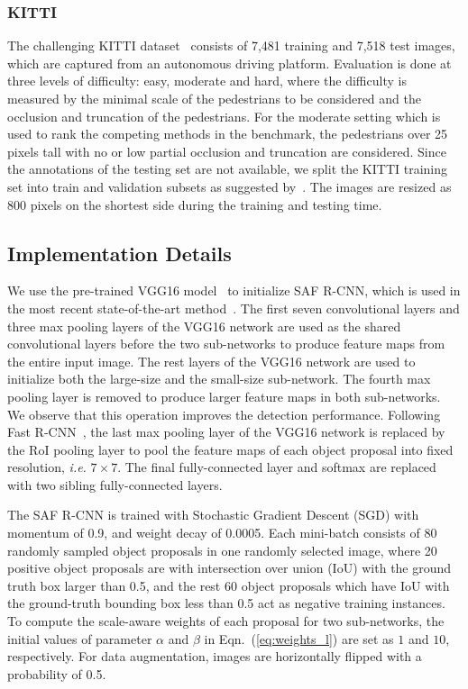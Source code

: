\documentclass[journal]{IEEEtran}
\begin{document}
\subsubsection{KITTI}
The challenging KITTI dataset~\cite{geiger2012we} consists of 7,481 training and 7,518 test images, which are captured from an autonomous driving platform. Evaluation is done at three levels of difficulty: easy, moderate and hard, where the difficulty is measured by the minimal scale of the pedestrians to be considered and the occlusion and truncation of the pedestrians. For the moderate setting which is used to rank the competing methods in the benchmark, the pedestrians over 25 pixels tall with no or low partial occlusion and truncation are considered. Since the annotations of the testing set are not available, we split the KITTI training set into train and validation subsets as suggested by~\cite{chen20153d}. The images are resized as $800$ pixels on the shortest side during the training and testing time.  


\subsection{Implementation Details}
We use the pre-trained VGG16 model~\cite{simonyan2014very} to initialize SAF R-CNN, which is used in the most recent state-of-the-art method~\cite{compact}. The first seven convolutional layers and three max pooling layers of the VGG16 network are used as the shared convolutional layers before the two sub-networks to produce feature maps from the entire input image. The rest layers of the VGG16 network are used to initialize both the large-size and the small-size sub-network. The fourth max pooling layer is removed to produce larger feature maps in both sub-networks. We observe that this operation improves the  detection performance. Following Fast R-CNN~\cite{girshick2015fast}, the last max pooling layer of the VGG16 network is replaced by the RoI pooling layer to pool the feature maps of each object proposal into fixed resolution, \emph{i.e.} $7\times7$. The final fully-connected layer and softmax are replaced with two sibling fully-connected layers.

The SAF R-CNN is trained with Stochastic Gradient Descent (SGD) with momentum of 0.9, and weight decay of 0.0005. Each mini-batch consists of 80 randomly sampled object proposals in one randomly selected image, where 20 positive object proposals are with intersection over union (IoU) with the ground truth box larger than 0.5, and the rest 60 object proposals which have IoU with the ground-truth bounding box less than 0.5 act as negative training instances. To compute the scale-aware weights of each proposal for two sub-networks, the initial values of parameter $\alpha$ and $\beta$ in Eqn.~(\ref{eq:weights_l}) are set as $1$ and $10$, respectively.
For data augmentation, images are horizontally flipped with a probability of 0.5.
\end{document}
